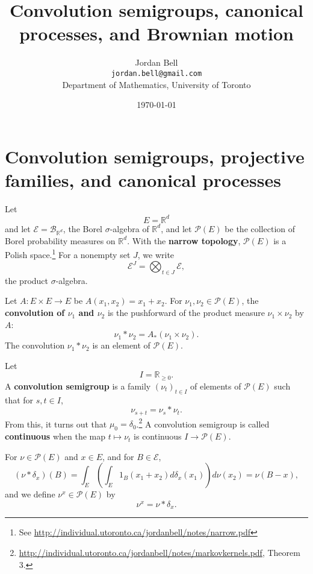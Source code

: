 \documentclass{article}
\theoremstyle{definition}
\begin{document}
\title{Convolution semigroups, canonical processes, and Brownian motion}
\author{Jordan Bell\\ \texttt{jordan.bell@gmail.com}\\Department of Mathematics, University of Toronto}
\date{\today}

\maketitle


\section{Convolution semigroups, projective families, and canonical processes}
Let
\[
E=\mathbb{R}^d
\]
and let $\mathscr{E}=\mathscr{B}_{\mathbb{R}^d}$, the Borel $\sigma$-algebra of $\mathbb{R}^d$, and
let $\mathscr{P}(E)$ be the collection of Borel probability measures on $\mathbb{R}^d$. With the \textbf{narrow
topology}, $\mathscr{P}(E)$ is a Polish space.\footnote{See \url{http://individual.utoronto.ca/jordanbell/notes/narrow.pdf}}
For a nonempty set $J$, we write
\[
\mathscr{E}^J = \bigotimes_{t \in J} \mathscr{E},
\]
the product $\sigma$-algebra.

Let $A:E \times E \to E$ be $A(x_1,x_2) = x_1+x_2$. For $\nu_1,\nu_2 \in \mathscr{P}(E)$,
the \textbf{convolution of $\nu_1$ and $\nu_2$} is the pushforward of the product measure $\nu_1 \times \nu_2$ 
by $A$:
\[
\nu_1 * \nu_2 = A_*(\nu_1 \times \nu_2).
\]
The convolution $\nu_1 * \nu_2$ is an element of $\mathscr{P}(E)$. 


Let
\[
I=\mathbb{R}_{\geq 0}.
\]
A \textbf{convolution semigroup} is a family $(\nu_t)_{t \in I}$ of elements of $\mathscr{P}(E)$ such that
for $s,t \in I$,
\[
\nu_{s+t} = \nu_s * \nu_t.
\]
From this, it turns out that $\mu_0=\delta_0$.\footnote{\url{http://individual.utoronto.ca/jordanbell/notes/markovkernels.pdf}, Theorem 3.}
A convolution semigroup is called \textbf{continuous} when the map $t \mapsto \nu_t$ is continuous $I \to \mathscr{P}(E)$. 

For $\nu \in \mathscr{P}(E)$ and $x \in E$, and for $B \in \mathscr{E}$,
\[
(\nu * \delta_x)(B)
 =
\int_{E} \left( \int_{E} 1_B(x_1+x_2) d\delta_x(x_1) \right) d\nu(x_2) 
=\nu(B-x),
\]
and we define  $\nu^x \in \mathscr{P}(E)$ by
\[
\nu^x = \nu * \delta_x.
\] 
\end{document}

